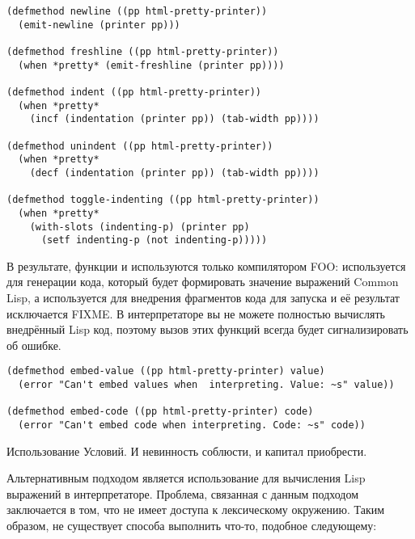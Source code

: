 \begin{lstlisting}
(defmethod newline ((pp html-pretty-printer))
  (emit-newline (printer pp)))

(defmethod freshline ((pp html-pretty-printer))
  (when *pretty* (emit-freshline (printer pp))))

(defmethod indent ((pp html-pretty-printer))
  (when *pretty* 
    (incf (indentation (printer pp)) (tab-width pp))))

(defmethod unindent ((pp html-pretty-printer))
  (when *pretty* 
    (decf (indentation (printer pp)) (tab-width pp))))

(defmethod toggle-indenting ((pp html-pretty-printer))
  (when *pretty* 
    (with-slots (indenting-p) (printer pp)
      (setf indenting-p (not indenting-p)))))
\end{lstlisting}

В результате, функции  и  используются только
компилятором FOO:  используется для генерации кода, который будет
формировать значение выражений Common Lisp, а  используется для внедрения
фрагментов кода для запуска и её результат исключается FIXME. В интерпретаторе вы не
можете полностью вычислять внедрённый Lisp код, поэтому вызов этих функций всегда будет
сигнализировать об ошибке.

\begin{lstlisting}
(defmethod embed-value ((pp html-pretty-printer) value)
  (error "Can't embed values when  interpreting. Value: ~s" value))

(defmethod embed-code ((pp html-pretty-printer) code)
  (error "Can't embed code when interpreting. Code: ~s" code))
\end{lstlisting}


Использование Условий. И невинность соблюсти, и капитал приобрести.


Альтернативным подходом является использование  для вычисления Lisp выражений в
интерпретаторе. Проблема, связанная с данным подходом заключается в том, что 
не имеет доступа к лексическому окружению. Таким образом, не существует способа выполнить
что-то, подобное следующему:

